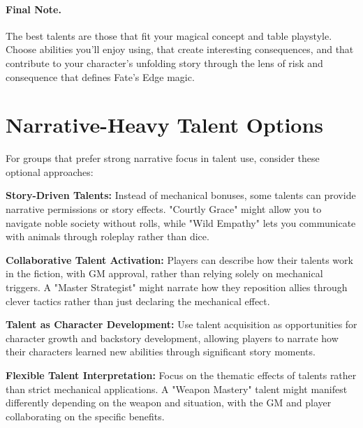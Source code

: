 \paragraph{Final Note.}
The best talents are those that fit your magical concept and table playstyle. Choose abilities you'll enjoy using, that create interesting consequences, and that contribute to your character's unfolding story through the lens of risk and consequence that defines Fate's Edge magic.

\section{Narrative-Heavy Talent Options}

For groups that prefer strong narrative focus in talent use, consider these optional approaches:

\textbf{Story-Driven Talents:} Instead of mechanical bonuses, some talents can provide narrative permissions or story effects. "Courtly Grace" might allow you to navigate noble society without rolls, while "Wild Empathy" lets you communicate with animals through roleplay rather than dice.

\textbf{Collaborative Talent Activation:} Players can describe how their talents work in the fiction, with GM approval, rather than relying solely on mechanical triggers. A "Master Strategist" might narrate how they reposition allies through clever tactics rather than just declaring the mechanical effect.

\textbf{Talent as Character Development:} Use talent acquisition as opportunities for character growth and backstory development, allowing players to narrate how their characters learned new abilities through significant story moments.

\textbf{Flexible Talent Interpretation:} Focus on the thematic effects of talents rather than strict mechanical applications. A "Weapon Mastery" talent might manifest differently depending on the weapon and situation, with the GM and player collaborating on the specific benefits.
